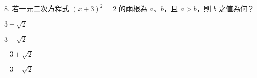 \documentclass[12pt]{article}
\begin{document}
\begin{problem}
  \item[8.] 若一元二次方程式 $(x + 3)^2 = 2$ 的兩根為 $a$、$b$，且 $a > b$，則 $b$ 之值為何？
  \begin{choices}
    \item $3+\sqrt{2}$
    \item $3-\sqrt{2}$
    \item $-3+\sqrt{2}$
    \item $-3-\sqrt{2}$
  \end{choices}
\end{problem}
\end{document}
